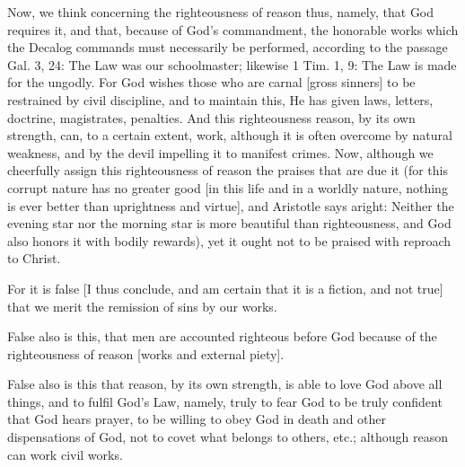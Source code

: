 Now, we think concerning the righteousness of reason thus, namely,
that God requires it, and that, because of God's commandment, the
honorable works which the Decalog commands must necessarily be
performed, according to the passage Gal. 3, 24: The Law was our
schoolmaster; likewise 1 Tim. 1, 9: The Law is made for the ungodly.
For God wishes those who are carnal [gross sinners] to be restrained
by civil discipline, and to maintain this, He has given laws, letters,
doctrine, magistrates, penalties.  And this righteousness reason, by
its own strength, can, to a certain extent, work, although it is
often overcome by natural weakness, and by the devil impelling it to
manifest crimes.  Now, although we cheerfully assign this
righteousness of reason the praises that are due it (for this corrupt
nature has no greater good [in this life and in a worldly nature,
nothing is ever better than uprightness and virtue], and Aristotle
says aright: Neither the evening star nor the morning star is more
beautiful than righteousness, and God also honors it with bodily
rewards), yet it ought not to be praised with reproach to Christ.

For it is false [I thus conclude, and am certain that it is a fiction,
and not true] that we merit the remission of sins by our works.

False also is this, that men are accounted righteous before God
because of the righteousness of reason [works and external piety].

False also is this that reason, by its own strength, is able to love
God above all things, and to fulfil God's Law, namely, truly to fear
God to be truly confident that God hears prayer, to be willing to
obey God in death and other dispensations of God, not to covet what
belongs to others, etc.; although reason can work civil works.

